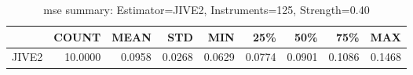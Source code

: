 \begin{table}[ht]
\centering
\caption{mse summary: Estimator=JIVE2, Instruments=125, Strength=0.40}
\begin{tabular}{lrrrrrrrr}
\toprule
 & COUNT & MEAN & STD & MIN & 25\% & 50\% & 75\% & MAX \\
\midrule
JIVE2 & 10.0000 & 0.0958 & 0.0268 & 0.0629 & 0.0774 & 0.0901 & 0.1086 & 0.1468 \\
\bottomrule
\end{tabular}
\end{table}
